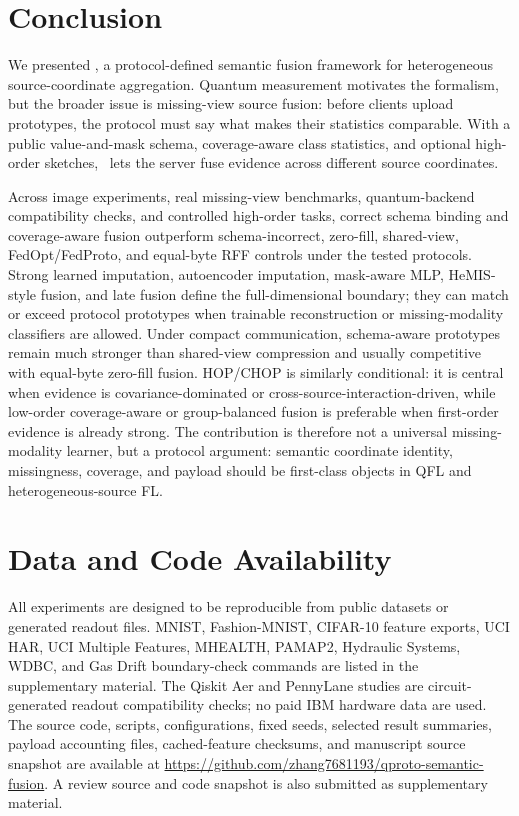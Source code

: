 \section{Conclusion}

We presented \method, a protocol-defined semantic fusion framework for heterogeneous source-coordinate aggregation. Quantum measurement motivates the formalism, but the broader issue is missing-view source fusion: before clients upload prototypes, the protocol must say what makes their statistics comparable. With a public value-and-mask schema, coverage-aware class statistics, and optional high-order sketches, \method\ lets the server fuse evidence across different source coordinates.

Across image experiments, real missing-view benchmarks, quantum-backend compatibility checks, and controlled high-order tasks, correct schema binding and coverage-aware fusion outperform schema-incorrect, zero-fill, shared-view, FedOpt/FedProto, and equal-byte RFF controls under the tested protocols. Strong learned imputation, autoencoder imputation, mask-aware MLP, HeMIS-style fusion, and late fusion define the full-dimensional boundary; they can match or exceed protocol prototypes when trainable reconstruction or missing-modality classifiers are allowed. Under compact communication, schema-aware prototypes remain much stronger than shared-view compression and usually competitive with equal-byte zero-fill fusion. HOP/CHOP is similarly conditional: it is central when evidence is covariance-dominated or cross-source-interaction-driven, while low-order coverage-aware or group-balanced fusion is preferable when first-order evidence is already strong. The contribution is therefore not a universal missing-modality learner, but a protocol argument: semantic coordinate identity, missingness, coverage, and payload should be first-class objects in QFL and heterogeneous-source FL.

\section*{Data and Code Availability}

All experiments are designed to be reproducible from public datasets or generated readout files. MNIST, Fashion-MNIST, CIFAR-10 feature exports, UCI HAR, UCI Multiple Features, MHEALTH, PAMAP2, Hydraulic Systems, WDBC, and Gas Drift boundary-check commands are listed in the supplementary material. The Qiskit Aer and PennyLane studies are circuit-generated readout compatibility checks; no paid IBM hardware data are used. The source code, scripts, configurations, fixed seeds, selected result summaries, payload accounting files, cached-feature checksums, and manuscript source snapshot are available at \url{https://github.com/zhang7681193/qproto-semantic-fusion}. A review source and code snapshot is also submitted as supplementary material.

